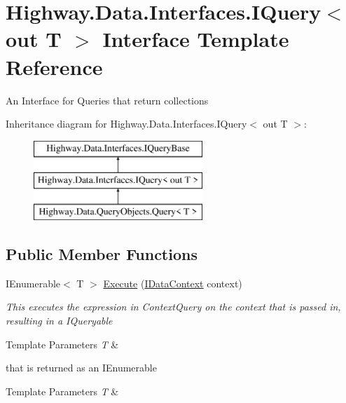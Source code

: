 \hypertarget{interface_highway_1_1_data_1_1_interfaces_1_1_i_query-g}{\section{Highway.\-Data.\-Interfaces.\-I\-Query$<$ out T $>$ Interface Template Reference}
\label{interface_highway_1_1_data_1_1_interfaces_1_1_i_query-g}
}


An Interface for Queries that return collections  


Inheritance diagram for Highway.\-Data.\-Interfaces.\-I\-Query$<$ out T $>$\-:\begin{figure}[H]
\begin{center}
\leavevmode
\includegraphics[height=3.000000cm]{interface_highway_1_1_data_1_1_interfaces_1_1_i_query-g}
\end{center}
\end{figure}
\subsection*{Public Member Functions}
\begin{DoxyCompactItemize}
\item 
I\-Enumerable$<$ T $>$ \hyperlink{interface_highway_1_1_data_1_1_interfaces_1_1_i_query-g_af0d1ad34be86383555892f3dfeb4b2dc}{Execute} (\hyperlink{interface_highway_1_1_data_1_1_interfaces_1_1_i_data_context}{I\-Data\-Context} context)
\begin{DoxyCompactList}\small\item\em This executes the expression in Context\-Query on the context that is passed in, resulting in a I\-Queryable
\begin{DoxyTemplParams}{Template Parameters}
{\em T} & \\
\hline
\end{DoxyTemplParams}
that is returned as an I\-Enumerable
\begin{DoxyTemplParams}{Template Parameters}
{\em T} & \\
\hline
\end{DoxyTemplParams}
\end{DoxyCompactList}\end{DoxyCompactItemize}


